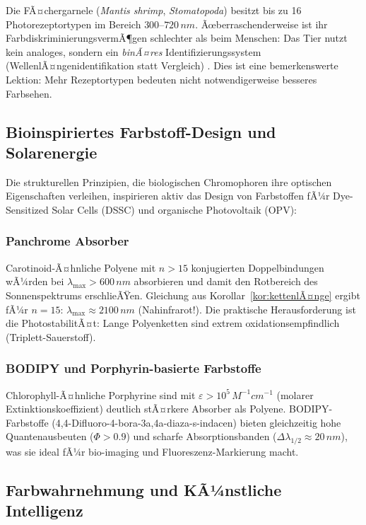 ﻿\documentclass[a4paper,12pt]{article}
\theoremstyle{definition}
\begin{document}
Die FÃ¤chergarnele (\textit{Mantis shrimp}, \textit{Stomatopoda}) besitzt
bis zu 16 Photorezeptortypen im Bereich $300$--$720\,\si{nm}$.
Ãœberraschenderweise ist ihr FarbdiskriminierungsvermÃ¶gen schlechter
als beim Menschen: Das Tier nutzt kein analoges, sondern ein \emph{binÃ¤res}
Identifizierungssystem (WellenlÃ¤ngenidentifikation statt Vergleich) \cite{thoen2014}.
Dies ist eine bemerkenswerte Lektion: Mehr Rezeptortypen bedeuten nicht
notwendigerweise besseres Farbsehen.

\subsection{Bioinspiriertes Farbstoff-Design und Solarenergie}

Die strukturellen Prinzipien, die biologischen Chromophoren ihre optischen
Eigenschaften verleihen, inspirieren aktiv das Design von Farbstoffen fÃ¼r
Dye-Sensitized Solar Cells (DSSC) und organische Photovoltaik (OPV):

\subsubsection{Panchrome Absorber}

Carotinoid-Ã¤hnliche Polyene mit $n > 15$ konjugierten Doppelbindungen
wÃ¼rden bei $\lambda_{\max} > 600\,\si{nm}$ absorbieren und damit den Rotbereich
des Sonnenspektrums erschlieÃŸen. Gleichung aus Korollar~\ref{kor:kettenlÃ¤nge}
ergibt fÃ¼r $n=15$: $\lambda_{\max} \approx 2100\,\si{nm}$ (Nahinfrarot!).
Die praktische Herausforderung ist die PhotostabilitÃ¤t: Lange Polyenketten
sind extrem oxidationsempfindlich (Triplett-Sauerstoff).

\subsubsection{BODIPY und Porphyrin-basierte Farbstoffe}

Chlorophyll-Ã¤hnliche Porphyrine sind mit $\varepsilon > 10^5\,\si{M^{-1}cm^{-1}}$
(molarer Extinktionskoeffizient) deutlich stÃ¤rkere Absorber als Polyene.
BODIPY-Farbstoffe (4,4-Difluoro-4-bora-3a,4a-diaza-s-indacen) bieten
gleichzeitig hohe Quantenausbeuten ($\Phi > 0.9$) und scharfe Absorptionsbanden
($\Delta\lambda_{1/2} \approx 20\,\si{nm}$), was sie ideal fÃ¼r bio-imaging
und Fluoreszenz-Markierung macht.

\subsection{Farbwahrnehmung und KÃ¼nstliche Intelligenz}
\end{document}
